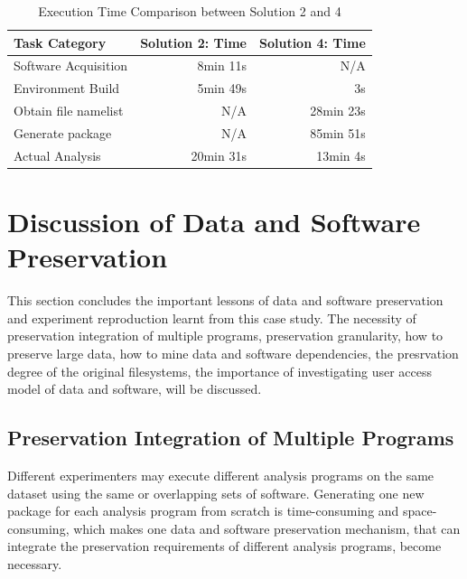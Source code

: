 \documentclass{acm_proc_article-sp}
\begin{document}
\begin{table}
    \centering
    \begin{tabular}{|l|r|r|}
    \hline
    Task Category & Solution 2: Time & Solution 4: Time\\ \hline
    Software Acquisition & 8min 11s & N/A \\ \hline
    Environment Build & 5min 49s  & 3s \\ \hline
    Obtain file namelist & N/A & 28min 23s \\ \hline
    Generate package & N/A & 85min 51s \\ \hline
    Actual Analysis & 20min 31s & 13min 4s \\ \hline
    \end{tabular}
    \caption{Execution Time Comparison between Solution 2 and 4}
    \label{table:time-2nd3rd}
\end{table}    

\section{Discussion of Data and Software Preservation}

This section concludes the important lessons of data and software preservation and experiment reproduction learnt from this case study. 
The necessity of preservation integration of multiple programs, preservation granularity, how to preserve large data, how to mine data and software dependencies,
the presrvation degree of the original filesystems, the importance of investigating user access model of data and software, will be discussed. 

\subsection{Preservation Integration of Multiple Programs}

Different experimenters may execute different analysis
programs on the same dataset using the same or overlapping sets of software.
Generating one new package for each analysis program from scratch is
time-consuming and space-consuming, which makes one data and software
preservation mechanism, that can integrate the preservation requirements of
different analysis programs, become necessary. 
\end{document}
